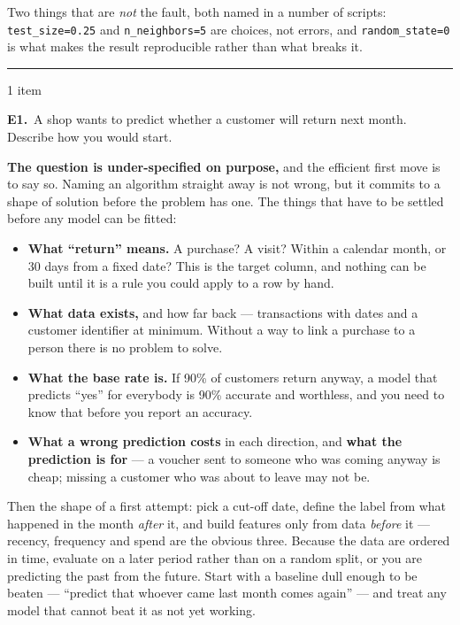\documentclass[10pt,a4paper]{article}
\newcommand{\parthead}[2]{\vspace{2pt}\noindent\rule{\linewidth}{0.4pt}\par\vspace{2pt}%
  \noindent{\bfseries Block #1}\hfill{\small #2}\par\vspace{1pt}}
\begin{document}
Two things that are \emph{not} the fault, both named in a number of scripts: \texttt{test\_size=0.25}
and \texttt{n\_neighbors=5} are choices, not errors, and \texttt{random\_state=0} is what makes the
result reproducible rather than what breaks it.

\parthead{E --- Getting started}{1 item}

\textbf{E1.}\ A shop wants to predict whether a customer will return next month. Describe how you
would start.

\vspace{2pt}

\textbf{The question is under-specified on purpose,} and the efficient first move is to say so. Naming
an algorithm straight away is not wrong, but it commits to a shape of solution before the problem has
one. The things that have to be settled before any model can be fitted:

\begin{itemize}[leftmargin=6mm,topsep=2pt,itemsep=1.5pt]
  \item \textbf{What ``return'' means.} A purchase? A visit? Within a calendar month, or 30 days from
        a fixed date? This is the target column, and nothing can be built until it is a rule you could
        apply to a row by hand.
  \item \textbf{What data exists,} and how far back --- transactions with dates and a customer
        identifier at minimum. Without a way to link a purchase to a person there is no problem to
        solve.
  \item \textbf{What the base rate is.} If 90\% of customers return anyway, a model that predicts
        ``yes'' for everybody is 90\% accurate and worthless, and you need to know that before you
        report an accuracy.
  \item \textbf{What a wrong prediction costs} in each direction, and \textbf{what the prediction is
        for} --- a voucher sent to someone who was coming anyway is cheap; missing a customer who was
        about to leave may not be.
\end{itemize}

Then the shape of a first attempt: pick a cut-off date, define the label from what happened in the
month \emph{after} it, and build features only from data \emph{before} it --- recency, frequency and
spend are the obvious three. Because the data are ordered in time, evaluate on a later period rather
than on a random split, or you are predicting the past from the future. Start with a baseline dull
enough to be beaten --- ``predict that whoever came last month comes again'' --- and treat any model
that cannot beat it as not yet working.
\end{document}

